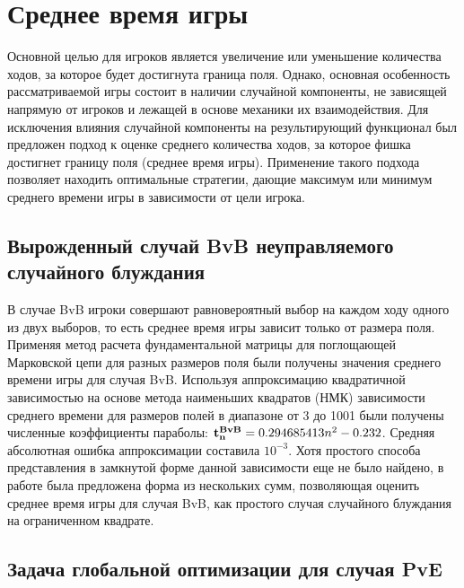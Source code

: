\section{Среднее время игры}\label{sec:ch3/sec1}

Основной целью для игроков является увеличение или уменьшение количества ходов, за которое будет достигнута граница поля.
Однако, основная особенность рассматриваемой игры состоит в наличии случайной компоненты, не зависящей напрямую от игроков и лежащей в основе механики их взаимодействия.
Для исключения влияния случайной компоненты на результирующий функционал был предложен подход к оценке среднего количества ходов,
за которое фишка достигнет границу поля (среднее время игры).
Применение такого подхода позволяет находить оптимальные стратегии, дающие максимум или минимум среднего времени игры в зависимости от цели игрока.

\subsection{Вырожденный случай BvB неуправляемого случайного блуждания}\label{subsec:ch3/sec1/sub1}

В случае BvB игроки совершают равновероятный выбор на каждом ходу одного из двух выборов, то есть среднее время игры зависит только от размера поля.
Применяя метод расчета фундаментальной матрицы для поглощающей Марковской цепи для разных размеров поля были получены значения среднего времени игры для случая BvB.
Используя аппроксимацию квадратичной зависимостью на основе метода наименьших квадратов (НМК) зависимости среднего времени для размеров полей в диапазоне от 3 до 1001
были получены численные коэффициенты параболы: ${\bf t_n^{BvB}} = 0.294685413 n^2 - 0.232$. Средняя абсолютная ошибка аппроксимации составила $10^{-3}$. 
Хотя простого способа представления в замкнутой форме данной зависимости еще не было найдено, в работе \cite{} была предложена форма из нескольких сумм, позволяющая оценить
среднее время игры для случая BvB, как простого случая случайного блуждания на ограниченном квадрате.

\subsection{Задача глобальной оптимизации для случая PvE}\label{subsec:ch3/sec1/sub1}

